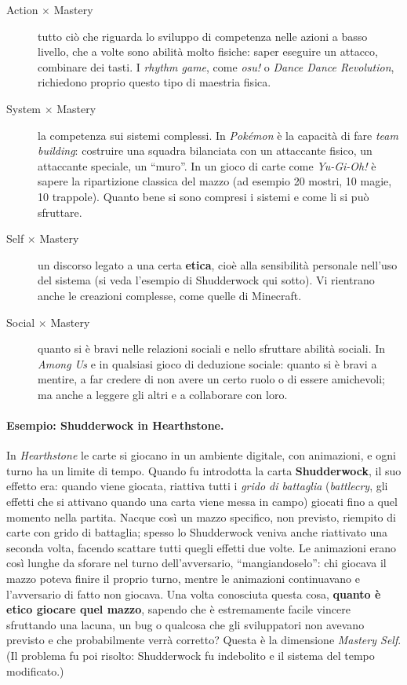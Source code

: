 \begin{description}
  \item[Action $\times$ Mastery] tutto ciò che riguarda lo sviluppo di
        competenza nelle azioni a basso livello, che a volte sono abilità molto
        fisiche: saper eseguire un attacco, combinare dei tasti. I
        \emph{rhythm game}, come \emph{osu!} o \emph{Dance Dance Revolution},
        richiedono proprio questo tipo di maestria fisica.
  \item[System $\times$ Mastery] la competenza sui sistemi complessi. In
        \emph{Pokémon} è la capacità di fare \emph{team building}: costruire
        una squadra bilanciata con un attaccante fisico, un attaccante speciale,
        un ``muro''. In un gioco di carte come \emph{Yu-Gi-Oh!} è sapere la
        ripartizione classica del mazzo (ad esempio 20 mostri, 10 magie, 10
        trappole). Quanto bene si sono compresi i sistemi e come li si può
        sfruttare.
  \item[Self $\times$ Mastery] un discorso legato a una certa
        \textbf{etica}, cioè alla sensibilità personale nell'uso del sistema
        (si veda l'esempio di Shudderwock qui sotto). Vi rientrano anche le
        creazioni complesse, come quelle di Minecraft.
  \item[Social $\times$ Mastery] quanto si è bravi nelle relazioni sociali e
        nello sfruttare abilità sociali. In \emph{Among Us} e in qualsiasi
        gioco di deduzione sociale: quanto si è bravi a mentire, a far credere
        di non avere un certo ruolo o di essere amichevoli; ma anche a leggere
        gli altri e a collaborare con loro.
\end{description}

\paragraph{Esempio: Shudderwock in Hearthstone.} In \emph{Hearthstone} le
carte si giocano in un ambiente digitale, con animazioni, e ogni turno ha un
limite di tempo. Quando fu introdotta la carta \textbf{Shudderwock}, il suo
effetto era: quando viene giocata, riattiva tutti i \emph{grido di battaglia}
(\emph{battlecry}, gli effetti che si attivano quando una carta viene messa in
campo) giocati fino a quel momento nella partita. Nacque così un mazzo
specifico, non previsto, riempito di carte con grido di battaglia; spesso lo
Shudderwock veniva anche riattivato una seconda volta, facendo scattare tutti
quegli effetti due volte. Le animazioni erano così lunghe da sforare nel turno
dell'avversario, ``mangiandoselo'': chi giocava il mazzo poteva finire il
proprio turno, mentre le animazioni continuavano e l'avversario di fatto non
giocava. Una volta conosciuta questa cosa, \textbf{quanto è etico giocare quel
mazzo}, sapendo che è estremamente facile vincere sfruttando una lacuna, un
bug o qualcosa che gli sviluppatori non avevano previsto e che probabilmente
verrà corretto? Questa è la dimensione \emph{Mastery Self}. (Il problema fu
poi risolto: Shudderwock fu indebolito e il sistema del tempo modificato.)

